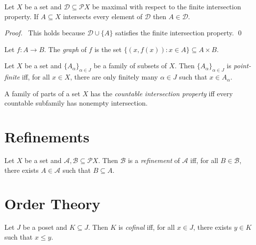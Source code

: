 \begin{lm}
  \label{lm:sets:finite_intersection_property:intersect_all}
  Let $X$ be a set and $\mathcal{D} \subseteq \mathcal{P} X$ be maximal with respect to the finite intersection property. If $A \subseteq X$ intersects every element of $\mathcal{D}$ then $A \in \mathcal{D}$.
\end{lm}

\begin{proof}
  \pf\ This holds because $\mathcal{D} \cup \{ A \}$ satisfies the finite intersection property. \qed
\end{proof}

\begin{df}[Graph]
  Let $f : A \rightarrow B$. The \emph{graph} of $f$ is the set $\{ (x, f(x))
  : x \in A \} \subseteq A \times B$.
\end{df}

 \begin{df}
 Let $X$ be a set and $\{ A_\alpha \}_{\alpha \in J}$ be a family of subsets
 of $X$. Then $\{ A_\alpha \}_{\alpha \in J}$ is \emph{point-finite} iff, for
all $x \in X$, there are only finitely many $\alpha \in J$ such that $x \in
A_\alpha$.
\end{df}

\begin{df}
  A family of parts of a set $X$ has the \emph{countable intersection property} iff every countable subfamily has nonempty intersection.
\end{df}

\section{Refinements}

\begin{df}[Refinement]
  Let $X$ be a set and $\mathcal{A}, \mathcal{B} \subseteq \mathcal{P} X$. Then $\mathcal{B}$ is a \emph{refinement} of $\mathcal{A}$ iff, for all $B \in \mathcal{B}$, there exists $A \in \mathcal{A}$ such that $B \subseteq A$.
\end{df}

\section{Order Theory}

  \begin{df}[Cofinal]
  Let $J$ be a poset and $K \subseteq J$. Then $K$ is \emph{cofinal} iff, for
all $x \in J$, there exists $y \in K$ such that $x \leq y$.
\end{df}

